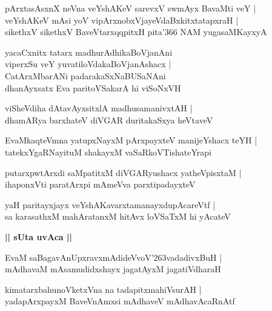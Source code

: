 \documentclass[twoside,12pt,openright]{book}
\def\S{\char'263}
\newcounter{shloka}[chapter]
\def\uvaca#1{\centerline{{\large\textbf{#1}}}}
\begin{document}
\begin{shloka}%
pArxtasAsxnX neVna veYshAKeV sarevxV swmAyx BavaMti veY |\\
veYshAKeV mAsi yoV vipArxnobxVjayeVdaBxkitxtatapxraH |\\
sikethxV sikethxV BaveVtarxqqpitxH pita\char'366 NAM  yugasaMKayxyA 
\end{shloka}

\begin{shloka}%
yacaCxnitx tatarx madhurAdhikaBoVjanAni \\
viperxSu veY yuvatiloVdakaBoVjanAshacx |\\
CatArxMbarANi padarakaSxNaBUSaNAni \\
dhanAyxsatx Eva paritoVSakarA hi viSoNxVH 
\end{shloka}

\begin{shloka}%
viSheVdiha dAtavAyxsitxlA madhusamanivxtAH |\\
dhamARya barxhateV diVGAR duritakaSxya heVtaveV 
\end{shloka}

\begin{shloka}%
EvaMkaqteVmna yatupxNayxM pArxpayxteV manijeYshacx teYH |\\
tatekxYgaRNayituM shakayxM vaSaRkoVTishateYrapi
\end{shloka}

\begin{shloka}%
putarxpwtArxdi saMpatitxM diVGARyushacx yatheVpisxtaM |\\
ihaponxVti paratArxpi mAmeVva parxtipadayxteV 
\end{shloka}

\begin{shloka}%
yaH paritayxjayx veYshAKavarxtamanayxdupAcareVtf |\\
sa karasathxM mahAratanxM hitAvx loVSaTxM hi yAcateV 
\end{shloka}

\uvaca{|| sUta uvAca ||}

\begin{shloka}%
EvaM saBagavAnUpxravxmAdideVvoV\S vadadivxBuH |\\
mAdhavaM mAsamudidxshayx jagatAyxM jagatiVdharaH 
\end{shloka}

\begin{shloka}%
kimatarxbahunoVketxVna na tadapitxmahiVsurAH |\\
yadapArxpayxM BaveVnAmxsi mAdhaveV mAdhavAcaRnAtf
\end{shloka}
\end{document}
